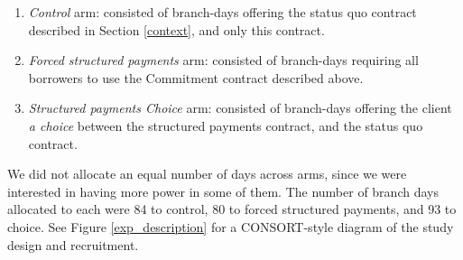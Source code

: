 \documentclass[12pt, a4paper]{article}
\begin{document}
\begin{enumerate}
    \item \textit{Control} arm: consisted of branch-days offering the status quo contract described in Section \ref{context}, and only this contract. 
    \item \textit{Forced structured payments} arm: consisted of branch-days requiring all borrowers to use the Commitment contract described above.  
    \item \textit{Structured payments Choice} arm: consisted of branch-days offering the client \textit{a choice} between the structured payments contract, and the status quo contract.
\end{enumerate}

We did not allocate an equal number of days across arms, since we were interested in having more power in some of them. The number of branch days allocated to each were 84 to control, 80 to forced structured payments, and 93 to choice. See Figure \ref{exp_description} for a CONSORT-style diagram of the study design and recruitment.

\vspace{.2in}
\end{document}
